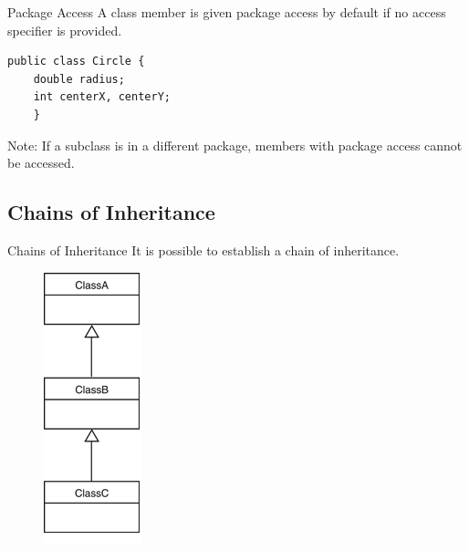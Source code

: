 \documentclass[11pt]{beamer}
\begin{document}
\begin{frame}[fragile]{Package Access}
    A class member is given package access by default if no access specifier is provided.
    \begin{lstlisting}
public class Circle {
    double radius;
    int centerX, centerY;
    }
    \end{lstlisting}
Note: If a subclass is in a different package, members with package access cannot be accessed.
\end{frame}

\subsection{Chains of Inheritance}
\begin{frame}{Chains of Inheritance}
    It is possible to establish a chain of inheritance.
    \noindent 
    \begin{figure}[H]
    \centering
    \includegraphics[scale=0.7]{Images/chapter10_section05_chainInheritance.png}
    \end{figure}
\end{frame}
\end{document}
